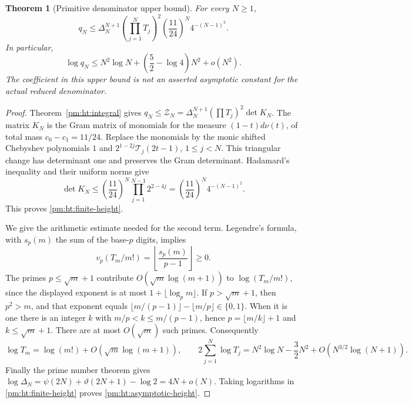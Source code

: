 \documentclass[11pt,a4paper]{article}
\newtheorem{theorem}{Theorem}[section]
\theoremstyle{definition}
\theoremstyle{remark}
\numberwithin{equation}{section}
\begin{document}
\begin{theorem}[Primitive denominator upper bound]\label{pm:ht:height}
For every $N\geq1$,
\begin{equation}\label{pm:ht:finite-height}
 q_N\leq \Delta_N^{N+1}\left(\prod_{j=1}^NT_j\right)^2
       \left(\frac{11}{24}\right)^N4^{-(N-1)^2}.
\end{equation}
In particular,
\begin{equation}\label{pm:ht:asymptotic-height}
 \log q_N\leq N^2\log N+
       \left(\frac52-\log4\right)N^2+o(N^2).
\end{equation}
The coefficient in this upper bound is not an asserted asymptotic
constant for the actual reduced denominator.
\end{theorem}
\begin{proof}
Theorem~\ref{pm:ht:integral} gives
$q_N\leq \mathcal Z_N=\Delta_N^{N+1}(\prod T_j)^2\det K_N$.
The matrix $K_N$ is the Gram matrix of monomials for the measure
$(1-t)d\nu(t)$, of total mass $c_0-c_1=11/24$.
Replace the monomials by the monic shifted Chebyshev polynomials
$1$ and $2^{1-2j}\mathcal T_j(2t-1)$, $1\leq j<N$.
This triangular change has determinant one and preserves the Gram
determinant.  Hadamard's inequality and their uniform norms give
\[
 \det K_N\leq\left(\frac{11}{24}\right)^N
                  \prod_{j=1}^{N-1}2^{2-4j}
       =\left(\frac{11}{24}\right)^N4^{-(N-1)^2}.
\]
This proves \eqref{pm:ht:finite-height}.

We give the arithmetic estimate needed for the second term.
Legendre's formula, with $s_p(m)$ the sum of the base-$p$ digits,
implies
\[
 v_p(T_m/m!)=
 \left\lfloor\frac{s_p(m)}{p-1}\right\rfloor\geq0.
\]
The primes $p\leq\sqrt m+1$ contribute
$O(\sqrt m\log(m+1))$ to $\log(T_m/m!)$, since the displayed
exponent is at most $1+\lfloor\log_pm\rfloor$.
If $p>\sqrt m+1$, then $p^2>m$, and that exponent equals
$\lfloor m/(p-1)\rfloor-\lfloor m/p\rfloor\in\{0,1\}$.
When it is one there is an integer $k$ with
$m/p<k\leq m/(p-1)$, hence $p=\lfloor m/k\rfloor+1$ and
$k\leq\sqrt m+1$.  There are at most $O(\sqrt m)$ such primes.
Consequently
\[
 \log T_m=\log(m!)+O(\sqrt m\log(m+1)),\qquad
 2\sum_{j=1}^N\log T_j
 =N^2\log N-\frac32N^2+O(N^{3/2}\log(N+1)).
\]
Finally the prime number theorem gives
$\log \Delta_N=\psi(2N)+\vartheta(2N+1)-\log2=4N+o(N)$.
Taking logarithms in \eqref{pm:ht:finite-height} proves
\eqref{pm:ht:asymptotic-height}.
\end{proof}
\end{document}
